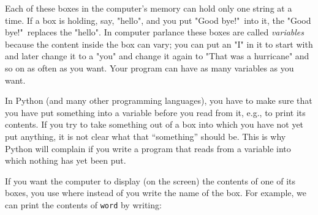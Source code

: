 Each of these boxes in the computer's memory can hold only one string at a time.  If a box is
holding, say, "hello", and you put "Good bye!"\ into it, the
"Good bye!"\ replaces the "hello".  In computer parlance these
boxes are called \emph{variables} because the content inside the box
can vary; you can put an "I" in it to start with and later change it
to a "you" and change it again to "That was a hurricane" and so on
as often as you want.
Your program can have as many variables as you want.


%
%
%
%
%
In Python (and many other programming languages), you have to make sure
that you have put something into a variable before you read from it,
e.g., to print its contents. If you try to take something out of a box
into which you have not yet put anything, it is not clear what that
``something'' should be. This is why Python will complain if you write
a program that reads from a variable into which nothing has yet been put.



If you want the computer to display (on the screen) the contents of one of
its boxes, you use  where instead of 
you write the name of the box.  For example, we can print the contents of
\verb!word! by writing:


